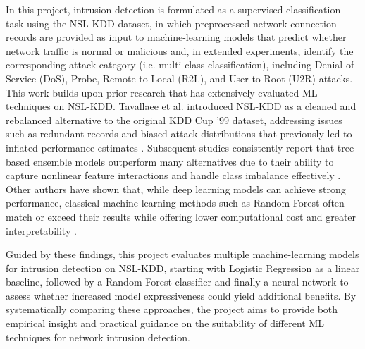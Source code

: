 In this project, intrusion detection is formulated as a supervised classification task using the NSL-KDD dataset, in which preprocessed network connection records are provided as input to machine-learning models that predict whether network traffic is normal or malicious and, in extended experiments, identify the corresponding attack category (i.e. multi-class classification), including Denial of Service (DoS), Probe, Remote-to-Local (R2L), and User-to-Root (U2R) attacks. This work builds upon prior research that has extensively evaluated ML techniques on NSL-KDD. Tavallaee et al. introduced NSL-KDD as a cleaned and rebalanced alternative to the original KDD Cup ’99 dataset, addressing issues such as redundant records and biased attack distributions that previously led to inflated performance estimates \cite{tavallaee2009detailed}. Subsequent studies consistently report that tree-based ensemble models outperform many alternatives due to their ability to capture nonlinear feature interactions and handle class imbalance effectively \cite{abrar2020machine, hegde2024intrusion, hong2021machine}. Other authors have shown that, while deep learning models can achieve strong performance, classical machine-learning methods such as Random Forest often match or exceed their results while offering lower computational cost and greater interpretability \cite{ali2025deep}.

Guided by these findings, this project evaluates multiple machine-learning models for intrusion detection on NSL-KDD, starting with Logistic Regression as a linear baseline, followed by a Random Forest classifier and finally a neural network to assess whether increased model expressiveness could yield additional benefits. By systematically comparing these approaches, the project aims to provide both empirical insight and practical guidance on the suitability of different ML techniques for network intrusion detection.